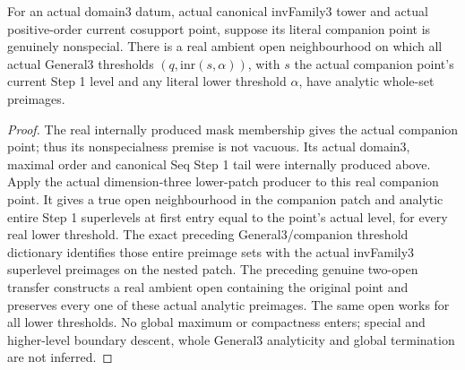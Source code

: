\begin{theorem}
\label{hir:general-three-actual-nonspecial-local-analytic-superlevels}
\leanok
For an actual domain3 datum, actual canonical invFamily3 tower and actual
positive-order current cosupport point, suppose its literal companion
point is genuinely nonspecial. There is a real ambient open neighbourhood
on which all actual General3 thresholds
$(q,\mathrm{inr}(s,\alpha))$, with $s$ the actual companion point's
current Step 1 level and any literal lower threshold $\alpha$, have
analytic whole-set preimages.
\end{theorem}
\begin{proof}
The real internally produced mask membership gives the actual companion
point; thus its nonspecialness premise is not vacuous. Its actual
domain3, maximal order and canonical Seq Step 1 tail were internally
produced above. Apply the actual dimension-three lower-patch producer
to this real companion point. It gives a true open neighbourhood in
the companion patch and analytic entire Step 1 superlevels at first
entry equal to the point's actual level, for every real lower threshold.
The exact preceding General3/companion threshold dictionary identifies
those entire preimage sets with the actual invFamily3 superlevel
preimages on the nested patch. The preceding genuine two-open transfer
constructs a real ambient open containing the original point and
preserves every one of these actual analytic preimages. The same open
works for all lower thresholds. No global maximum or compactness enters;
special and higher-level boundary descent, whole General3 analyticity
and global termination are not inferred.
\end{proof}
